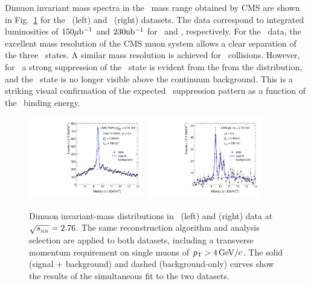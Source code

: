 Dimuon invariant mass spectra in the \PgU\ mass range obtained by CMS are shown in Fig.~\ref{fig:GR:mass} for the \PbPb\ (left)
and \pp\ (right) datasets. The data correspond to integrated luminosities of $150\mathrm{\mu b^{-1}}$ and $230 \mathrm{nb^{-1}}$ for
\PbPb\ and \pp, respectively. For the \pp\ data, the excellent mass resolution of the CMS muon system
allows a clear separation of the three \PgUn\ states. A similar mass resolution is achieved for \PbPb\ collisions.
However, for \PbPb\ a strong suppression of the \PgUb\ state is evident from the from the distribution, and the \PgUc\ state
is no longer visible above the continuum background. This is a striking visual confirmation of the expected
\PgU\ suppression pattern as a function of the \PgUn\ binding energy.

\begin{figure}[t]
\begin{center}
    \includegraphics[width=0.45\textwidth]{qqbarfigures/hiFitPt4Erf}
    \includegraphics[width=0.45\textwidth]{qqbarfigures/ppFitPt4Erf}
    \caption{Dimuon invariant-mass distributions in \PbPb\ (left) and \pp (right)
data at $\sqrt{s_{_{\rm NN}}} = 2.76$\TeV. The same reconstruction algorithm and analysis selection are applied to both datasets, including a transverse momentum requirement on single muons of $\mbox{$p_{\mathrm{T}}$} > 4\,\mathrm{GeV/c}$. The solid (signal + background) and dashed (background-only) curves show the results of the simultaneous fit to the two datasets.}
    \label{fig:GR:mass}
\end{center}
\end{figure}

